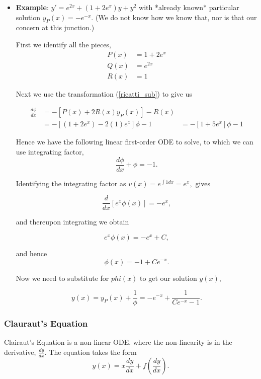 \begin{itemize}
\item {\bf{Example}}: $y' = e^{2x} + (1+2e^{x})y + y^2$ with *already known* particular solution $y_P(x) = -e^{-x}.$ (We do not know how we know that, nor is that our concern at this junction.)

First we identify all the pieces,
\begin{align*}
P(x) &= 1+2e^x \\
Q(x) &= e^{2x} \\
R(x) &= 1 
\end{align*}

Next we use the transformation (\ref{ricatti_sub}) to give us

\begin{align*}
\frac{d\phi}{dx} &= -\left[ P(x) + 2R(x) y_P(x) \right] - R(x) \\
&= -\left[ (1+2e^x) - 2(1)e^{x} \right] \phi - 1
&= -\left[ 1+5e^x \right ]\phi - 1
\end{align*}

Hence we have the following linear first-order ODE to solve, to which we can use integrating factor, $$\frac{d\phi}{dx} + \phi = -1.$$

Identifying the integrating factor as $v(x) = e^{\int 1 dx} = e^{x},$ gives

$$\frac{d}{dx} \left[ e^{x} \phi(x) \right] = -e^{x},$$

and thereupon integrating we obtain

$$ e^{x} \phi(x) = -e^{x} + C,$$

and hence $$\phi(x) = -1 + Ce^{-x}.$$

Now we need to substitute for $phi(x)$ to get our solution $y(x)$, 

$$y(x) = y_P(x) + \frac{1}{\phi} = -e^{-x} + \frac{1}{Ce^{-x} - 1}.$$


\end{itemize}



%
% 
\subsubsection{Clauraut's Equation}

Clairaut's Equation is a non-linear ODE, where the non-linearity is in the derivative, $\frac{dy}{dx}$. The equation takes the form 
\begin{equation}
\label{clairauts_eq} y(x) = x\frac{dy}{dx} + f\left( \frac{dy}{dx} \right).
\end{equation}

